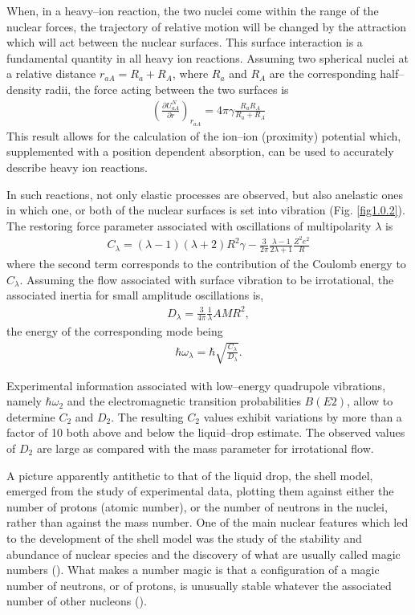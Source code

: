 \documentclass[a4paper,11pt]{book}
\numberwithin{equation}{section}
\numberwithin{figure}{section}
\numberwithin{table}{section}
\begin{document}
When, in a heavy--ion reaction, the two nuclei come within the range of the nuclear forces, the trajectory of relative motion will be changed by the attraction which will act between the nuclear surfaces. This surface interaction is a fundamental quantity in all heavy ion reactions. Assuming two spherical nuclei at a relative distance $r_{aA}=R_a+R_A$, where $R_a$ and $R_A$ are the corresponding half--density radii, the force acting between the two surfaces is
\begin{align}\label{eq1.0.4}
\left(\frac{\partial U_{aA}^N}{\partial r}\right)_{r_{aA}}=4\pi \gamma\frac{R_aR_A}{R_a+R_A}
\end{align}
This result allows for the calculation of the ion--ion (proximity) potential which, supplemented with a position dependent absorption, can be used to accurately describe heavy ion reactions.


In such reactions, not only elastic processes are observed, but also anelastic ones in which one, or both of the nuclear surfaces is set into vibration (Fig. \ref{fig1.0.2}). The restoring force parameter associated with oscillations of multipolarity $\lambda$ is 
\begin{align}\label{eq1.0.4b}
C_\lambda=(\lambda-1)(\lambda+2)R^2\gamma-\frac{3}{2\pi}\frac{\lambda-1}{2\lambda+1}\frac{Z^2e^2}{R}
\end{align}
where the second term corresponds to the contribution of the Coulomb energy to $C_\lambda$. Assuming the flow associated with surface vibration to be irrotational, the associated inertia for small amplitude oscillations is, 
\begin{align}\label{eq1.0.5}
D_{\lambda}=\frac{3}{4\pi}\frac{1}{\lambda}AMR^2,
\end{align}
the energy of the corresponding mode being
\begin{align}\label{eq1.0.6}
\hbar\omega_\lambda=\hbar\sqrt{\frac{C_\lambda}{D_\lambda}}.
\end{align}

Experimental information associated with low--energy quadrupole vibrations, namely $\hbar\omega_{2}$ and the electromagnetic transition probabilities $B(E2)$, allow to determine $C_2$ and $D_2$. The resulting $C_2$ values exhibit variations by more than a factor of 10 both above and below the liquid--drop estimate. The observed values of $D_2$ are large as compared with the mass parameter for irrotational flow.

A picture apparently antithetic to that of the liquid drop, the shell model, emerged from the study of experimental data, plotting them against either the number of protons (atomic number), or the number of neutrons in the nuclei, rather than against the mass number.
One of the main nuclear features which led to the development of the shell model was the study of the stability and abundance of nuclear species and the discovery of what are usually called magic numbers (\cite{Elsasser:33,Mayer:48,Haxel:49}). What makes a number magic is that a configuration of a magic number of neutrons, or of protons, is unusually stable whatever the associated number of other nucleons (\cite{Mayer:49,Mayer:49b}).
\end{document}

